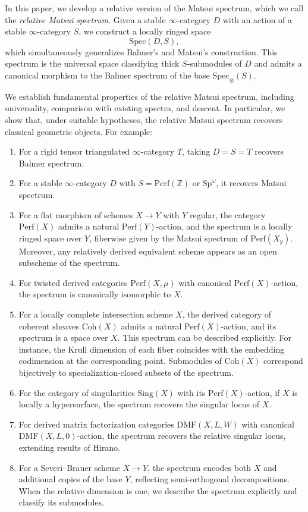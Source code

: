 \documentclass[11pt]{amsart}
\theoremstyle{definition}
\theoremstyle{plain}
\theoremstyle{remark}
\newcommand{\perf}{\mathrm{Perf}}
\newcommand{\coh}{{\mathrm{Coh}}}
\newcommand{\Spec}{\mathrm{Spec}}
\newcommand{\mo}{\mathrm}
\newcommand{\Sing}{\mathrm{Sing}}
\newcommand{\oSpec}{\mathrm{Spec}_{\otimes}}
\numberwithin{equation}{section}
\begin{document}
In this paper, we develop a relative version of the Matsui spectrum, which we call the \emph{relative Matsui spectrum}.  
Given a stable \(\infty\)-category \(D\) with an action of a stable \(\infty\)-category \(S\), we construct a locally ringed space
\[
\Spec(D,S),
\]
which simultaneously generalizes Balmer's and Matsui's construction.
This spectrum is the universal space classifying thick \(S\)-submodules of \(D\) and admits a canonical morphism to the Balmer spectrum of the base \(\oSpec(S)\).

We establish fundamental properties of the relative Matsui spectrum, including universality, comparison with existing spectra, and descent.
In particular, we show that, under suitable hypotheses, the relative Matsui spectrum recovers classical geometric objects.  
For example:
\begin{enumerate}
  \item For a rigid tensor triangulated \(\infty\)-category \(T\), taking \(D=S=T\) recovers Balmer spectrum.
  \item For a stable \(\infty\)-category \(D\) with \(S=\perf(\mathbb{Z})\) or \(\mo{Sp}^{\omega}\), it recovers Matsui spectrum. 
  \item For a flat morphism of schemes \(X\to Y\) with \(Y\) regular, the category \(\perf(X)\) admits a natural \(\perf(Y)\)-action, and the spectrum is a locally ringed space over \(Y\), fiberwise given by the Matsui spectrum of \(\perf(X_y)\).  
  Moreover, any relatively derived equivalent scheme appears as an open subscheme of the spectrum.
  \item For twisted derived categories \(\perf(X,\mu)\) with canonical \(\perf(X)\)-action, the spectrum is canonically isomorphic to \(X\).
  \item For a locally complete intersection scheme \(X\), the derived category of coherent sheaves \(\coh(X)\) admits a natural \(\perf(X)\)-action, and its spectrum is a space over \(X\).  
  This spectrum can be described explicitly.  
  For instance, the Krull dimension of each fiber coincides with the embedding codimension at the corresponding point.
  Submodules of \(\coh(X)\) correspond bijectively to specialization-closed subsets of the spectrum.
  \item For the category of singularities \(\Sing(X)\) with its \(\perf(X)\)-action, if \(X\) is locally a hypersurface, the spectrum recovers the singular locus of \(X\).
  \item For derived matrix factorization categories \(\mathrm{DMF}(X,L,W)\) with canonical \(\mathrm{DMF}(X,L,0)\)-action, the spectrum recovers the relative singular locus, extending results of Hirano.
  \item For a Severi--Brauer scheme \(X\to Y\), the spectrum encodes both \(X\) and additional copies of the base \(Y\), reflecting semi-orthogonal decompositions.  
  When the relative dimension is one, we describe the spectrum explicitly and classify its submodules.
\end{enumerate}
\end{document}
